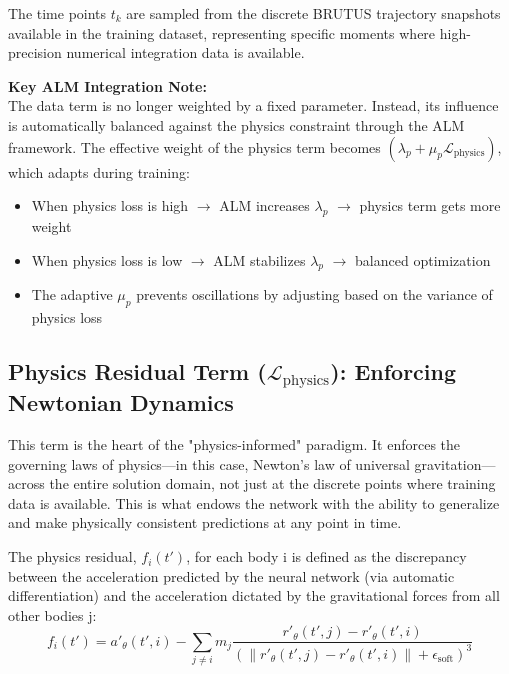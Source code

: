 The time points $t_k$ are sampled from the discrete BRUTUS trajectory snapshots available in the training dataset, representing specific moments where high-precision numerical integration data is available.



\textbf{Key ALM Integration Note:} \\
The data term is no longer weighted by a fixed parameter. Instead, its influence is automatically balanced against the physics constraint through the ALM framework. The effective weight of the physics term becomes $(\lambda_p + \mu_p \mathcal{L}_{\text{physics}})$, which adapts during training:
\begin{itemize}
    \item When physics loss is high $\rightarrow$ ALM increases $\lambda_p$ $\rightarrow$ physics term gets more weight
    \item When physics loss is low $\rightarrow$ ALM stabilizes $\lambda_p$ $\rightarrow$ balanced optimization
    \item The adaptive $\mu_p$ prevents oscillations by adjusting based on the variance of physics loss
\end{itemize}


\subsection[Physics Residual Term: Enforcing Newtonian Dynamics]{Physics Residual Term ($\mathcal{L}_{\text{physics}}$): Enforcing Newtonian Dynamics}

This term is the heart of the "physics-informed" paradigm. It enforces the governing laws of physics—in this case, Newton's law of universal gravitation—across the entire solution domain, not just at the discrete points where training data is available. This is what endows the network with the ability to generalize and make physically consistent predictions at any point in time.

The physics residual, $f_i(t')$, for each body $\mathrm{i}$ is defined as the discrepancy between the acceleration predicted by the neural network (via automatic differentiation) and the acceleration dictated by the gravitational forces from all other bodies $\mathrm{j}$:
\[
f_i(t') = a'_{\theta}(t', i) - \sum_{j \neq i} m_j \frac{r'_{\theta}(t', j) - r'_{\theta}(t', i)}{(\|r'_{\theta}(t', j) - r'_{\theta}(t', i)\| + \epsilon_{\text{soft}})^3}
\]

